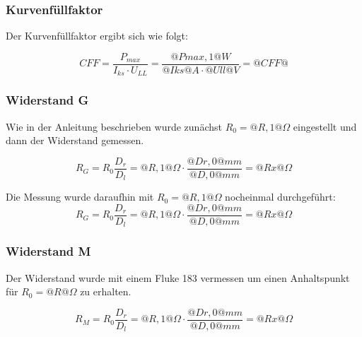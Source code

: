 \documentclass{article}
\begin{document}
\subsubsection{Kurvenfüllfaktor}

Der Kurvenfüllfaktor ergibt sich wie folgt:

$$CFF=\frac{P_{max}}{I_{ks}\cdot U_{LL}}=\frac{@Pmax,1@ W}{@Iks@ A \cdot @Ull@ V}=@CFF@$$


\subsubsection{Widerstand G}


Wie in der Anleitung beschrieben wurde zunächst $R_0=@R,1@\Omega$ eingestellt und dann der Widerstand gemessen.


$$R_G=R_0\frac{D_r}{D_l}=@R,1@ \Omega \cdot \frac{@Dr,0@ mm}{@D,0@ mm} = @Rx@ \Omega$$

%

Die Messung wurde daraufhin mit $R_0=@R,1@\Omega$ nocheinmal durchgeführt:
$$R_G=R_0\frac{D_r}{D_l}=@R,1@ \Omega \cdot \frac{@Dr,0@ mm}{@D,0@ mm} = @Rx@ \Omega$$


\subsubsection{Widerstand M}

Der Widerstand wurde mit einem Fluke 183 vermessen um einen
Anhaltspunkt für $R_0=@R@\Omega$ zu erhalten.

$$R_M=R_0\frac{D_r}{D_l}=@R,1@ \Omega \cdot \frac{@Dr,0@ mm}{@D,0@ mm} = @Rx@ \Omega$$
\end{document}
